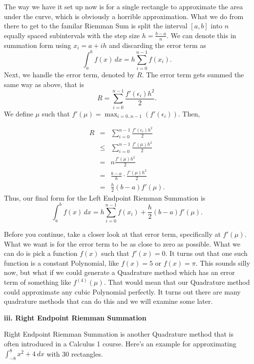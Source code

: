 \documentclass[12pt]{article}
\newcommand{\newLine}{\vspace{5mm}}
\newcommand{\nextsubsection}[1]{\newLine \noindent \large \textbf{#1} \normalsize}
\newcommand{\integral}[3]{\text{$\int^{#2}_{#1} #3\,dx$}}
\newcommand{\summation}[3]{\text{$\sum^{#2}_{#1} #3$}}
\begin{document}
The way we have it set up now is for a single rectangle to approximate the area under the curve, which is obviously a horrible approximation. What we do from there to get to the familar Riemman Sum is split the interval $[a,b]$ into $n$ equally spaced subintervals with the step size $h = \frac{b-a}{n}$. We can denote this in summation form using $x_i = a + ih$ and discarding the error term as
\begin{equation*} \integral{a}{b}{f(x)} = h\summation{i = 0}{n - 1}{f(x_i)}. \end{equation*}
Next, we handle the error term, denoted by $R$. The error term gets summed the same way as above, that is
\begin{equation*} R = \summation{i = 0}{n - 1}{\frac{{f'(\epsilon_i)}h^2}{2}}. \end{equation*}
We define $\mu$ such that $f'(\mu)=\displaystyle\max_{i=0..n-1}(f'(\epsilon_i))$. Then, 

\begin{eqnarray*} R &=& \summation{i = 0}{n - 1}{\frac{{f'(\epsilon_i)}h^2}{2}} \\
&\leq& \summation{i = 0}{n - 1}{\frac{{f'(\mu)}h^2}{2}} \\
&=& n\frac{{f'(\mu)}h^2}{2} \\
&=& \frac{b-a}{h}\cdot\frac{{f'(\mu)}h^2}{2} \\
&=& \frac{h}{2}(b-a)f'(\mu).
\end{eqnarray*}
Thus, our final form for the Left Endpoint Riemman Summation is 
\begin{equation*} 
\integral{a}{b}{f(x)} = h\summation{i = 0}{n - 1}{f(x_i)} + \frac{h}{2}(b-a)f'(\mu).
\end{equation*}

Before you continue, take a closer look at that error term, specifically at $f'(\mu)$. What we want is for the error term to be as close to zero as possible. What we can do is pick a function $f(x)$ such that $f'(x) = 0$. It turns out that one such function is a constant Polynomial, like $f(x) = 5$ or $f(x) = \pi$. This sounds silly now, but what if we could generate a Quadrature method which has an error term of something like $f^{(4)}(\mu)$. That would mean that our Quadrature method could approximate any cubic Polynomial perfectly. It turns out there are many quadrature methods that can do this and we will examine some later. 

\nextsubsection{iii. Right Endpoint Riemman Summation}

\newLine Right Endpoint Riemman Summation is another Quadrature method that is often introduced in a Calculus 1 course. Here's an example for approximating $\integral{-8}{8}{x^2+4}$ with 30 rectangles.
\end{document}
